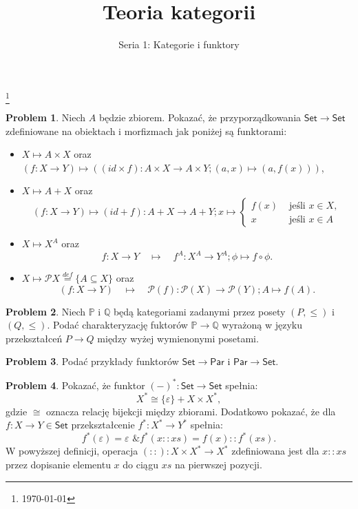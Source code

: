 \documentclass[10pt]{amsart}
\title{Teoria kategorii}
\author{Seria 1: Kategorie i funktory}
\theoremstyle{plain}
\theoremstyle{definition}
\newtheorem{problem}{Problem}
\numberwithin{equation}{section}
\newcommand\blfootnote[1]{%
  \begingroup
  \renewcommand\thefootnote{}\footnote{#1}%
  \addtocounter{footnote}{-1}%
  \endgroup
}
\begin{document}
\maketitle

\blfootnote{\today}


\begin{problem}
Niech $A$ będzie zbiorem. Pokazać, że przyporządkowania $\mathsf{Set}\to \mathsf{Set}$ zdefiniowane na obiektach i morfizmach jak poniżej są funktorami:
\begin{itemize}
\item $X\mapsto A\times X$ oraz $(f:X\to Y)\mapsto \left ((id \times f):A\times X\to A\times Y; (a,x)\mapsto (a,f(x))\right )$,
\item $X\mapsto A+ X$ oraz $$(f:X\to Y)\mapsto (id + f):A+ X\to A+ Y; x \mapsto \left \{ \begin{array}{cc}f(x)  &\text{ jeśli }x\in X, \\ x &\text{ jeśli }x\in A \end{array}\right. $$
\item $X\mapsto X^A$ oraz 
$$
f:X\to Y\quad \mapsto \quad f^A:X^A\to Y^A; \phi\mapsto f\circ \phi. 
$$
\item $X\mapsto \mathcal{P}X\stackrel{def}{=} \{ A\subseteq X \}$ oraz 
$$
(f:X\to Y)\quad \mapsto \quad \mathcal{P}(f):\mathcal{P}(X)\to \mathcal{P}(Y); A\mapsto f(A). 
$$
\end{itemize}
\end{problem}
%
\begin{problem}
Niech $\mathbb{P}$ i $\mathbb{Q}$ będą kategoriami zadanymi przez posety $(P,\leq)$ i $(Q,\leq)$. Podać charakteryzację fuktorów $\mathbb{P}\to \mathbb{Q}$ wyrażoną w języku przekształceń $P\to Q$ między wyżej wymienonymi posetami.
\end{problem}

\begin{problem}
Podać przykłady funktorów $\mathsf{Set}\to \mathsf{Par}$ i $\mathsf{Par}\to \mathsf{Set}$. 
\end{problem}

\begin{problem}
Pokazać, że funktor $(-)^\ast: \mathsf{Set}\to \mathsf{Set}$ spełnia:
$$
X^\ast \cong \{ \varepsilon \} + X\times X^\ast,
$$
gdzie $\cong$ oznacza relację bijekcji między zbiorami. Dodatkowo pokazać, że dla $f:X\to Y\in \mathsf{Set}$
przekształcenie $f^\ast: X^\ast \to Y^\ast$ spełnia:
$$
f^\ast (\varepsilon) = \varepsilon \text{ \& } f^\ast (x :: xs) = f(x) :: f^\ast (xs).
$$
W powyższej definicji, operacja $ (::) : X\times X^\ast \to X^\ast$ zdefiniowana
jest dla $x :: xs$ przez dopisanie elementu $x$ do ciągu $xs$ na pierwszej
pozycji.
\end{problem}
\end{document}
